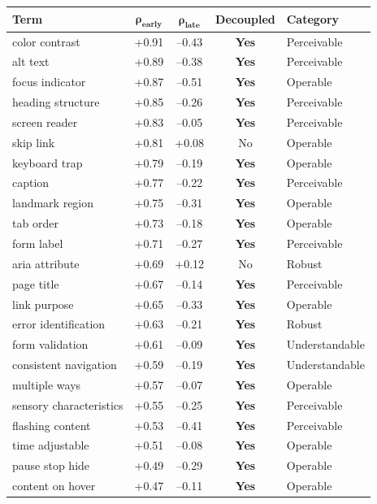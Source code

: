 \documentclass[10pt]{article} %
\begin{document}
\begin{table}[H]
\centering
\scriptsize
\begin{tabular}{|l|c|c|c|l|}
\hline
\textbf{Term} & $\mathbf{\rho_\text{early}}$ & $\mathbf{\rho_\text{late}}$ & \textbf{Decoupled} & \textbf{Category} \\
\hline
color contrast & +0.91 & --0.43 & \textbf{Yes} & Perceivable \\
alt text & +0.89 & --0.38 & \textbf{Yes} & Perceivable \\
focus indicator & +0.87 & --0.51 & \textbf{Yes} & Operable \\
heading structure & +0.85 & --0.26 & \textbf{Yes} & Perceivable \\
screen reader & +0.83 & --0.05 & \textbf{Yes} & Perceivable \\
skip link & +0.81 & +0.08 & No & Operable \\
keyboard trap & +0.79 & --0.19 & \textbf{Yes} & Operable \\
caption & +0.77 & --0.22 & \textbf{Yes} & Perceivable \\
landmark region & +0.75 & --0.31 & \textbf{Yes} & Operable \\
tab order & +0.73 & --0.18 & \textbf{Yes} & Operable \\
form label & +0.71 & --0.27 & \textbf{Yes} & Perceivable \\
aria attribute & +0.69 & +0.12 & No & Robust \\
page title & +0.67 & --0.14 & \textbf{Yes} & Perceivable \\
link purpose & +0.65 & --0.33 & \textbf{Yes} & Operable \\
error identification & +0.63 & --0.21 & \textbf{Yes} & Robust \\
form validation & +0.61 & --0.09 & \textbf{Yes} & Understandable \\
consistent navigation & +0.59 & --0.19 & \textbf{Yes} & Understandable \\
multiple ways & +0.57 & --0.07 & \textbf{Yes} & Operable \\
sensory characteristics & +0.55 & --0.25 & \textbf{Yes} & Perceivable \\
flashing content & +0.53 & --0.41 & \textbf{Yes} & Perceivable \\
time adjustable & +0.51 & --0.08 & \textbf{Yes} & Operable \\
pause stop hide & +0.49 & --0.29 & \textbf{Yes} & Operable \\
content on hover & +0.47 & --0.11 & \textbf{Yes} & Operable \\

\end{tabular}
\end{table}
\end{document}
